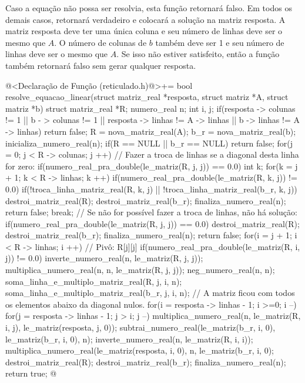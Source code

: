 Caso a equação não possa ser resolvia, esta função retornará falso. Em
todos os demais casos, retornará verdadeiro e colocará a solução na
matriz resposta. A matriz resposta deve ter uma única coluna e seu
número de linhas deve ser o mesmo que $A$. O número de colunas de $b$
também deve ser 1 e seu número de linhas deve ser o mesmo que $A$. Se
isso não estiver satisfeito, então a função também retornará falso sem
gerar qualquer resposta.

\iniciocodigo
@<Declaração de Função (reticulado.h)@>+=
bool resolve_equacao_linear(struct matriz_real *resposta,
                           struct matriz *A, struct matriz *b){
  struct matriz_real *R;
  numero_real n;
  int i, j;
  if(resposta -> colunas != 1 || b - > colunas != 1 ||
     resposta -> linhas != A -> linhas || b -> linhas != A -> linhas)
    return false;
  R = nova_matriz_real(A);
  b_r = nova_matriz_real(b);
  inicializa_numero_real(n);
  if(R == NULL || b_r == NULL)
    return false;
  for(j = 0; j < R -> colunas; j ++){
    // Fazer a troca de linhas se a diagonal desta linha for zero:
    if(numero_real_pra_double(le_matriz(R, j, j)) == 0.0){
      int k;
      for(k = j + 1; k < R -> linhas; k ++){
        if(numero_real_pra_double(le_matriz(R, k, j)) != 0.0){
          if(!troca_linha_matriz_real(R, k, j) ||
             !troca_linha_matriz_real(b_r, k, j)){
            destroi_matriz_real(R);
            destroi_matriz_real(b_r);
            finaliza_numero_real(n);
            return false;
          }
          break;
        }
        // Se não for possível fazer a troca de linhas, não há solução:
        if(numero_real_pra_double(le_matriz(R, j, j)) == 0.0){
          destroi_matriz_real(R);
          destroi_matriz_real(b_r);
          finaliza_numero_real(n);
          return false;
        }
      }
    }
    for(i = j + 1; i < R -> linhas; i ++){
      // Pivô: R[j][j]
      if(numero_real_pra_double(le_matriz(R, i, j)) != 0.0){
        inverte_numero_real(n, le_matriz(R, j, j));
        multiplica_numero_real(n, n, le_matriz(R, j, j));
        neg_numero_real(n, n);
        soma_linha_e_multiplo_matriz_real(R, j, i, n);
        soma_linha_e_multiplo_matriz_real(b_r, j, i, n);
      }
    }
  }
  // A matriz ficou com todos os elementos abaixo da diagonal nulos.
  for(i = resposta -> linhas - 1; i >=0; i --){
    for(j = resposta -> linhas - 1; j > i; j --){
      multiplica_numero_real(n, le_matriz(R, i, j),
                             le_matriz(resposta, j, 0));
      subtrai_numero_real(le_matriz(b_r, i, 0), le_matriz(b_r, i, 0), n);
    }
    inverte_numero_real(n, le_matriz(R, i, i));
    multiplica_numero_real(le_matriz(resposta, i, 0), n,
                           le_matriz(b_r, i, 0);
  }
  destroi_matriz_real(R);
  destroi_matriz_real(b_r);
  finaliza_numero_real(n);
  return true;
}
@
\fimcodigo


